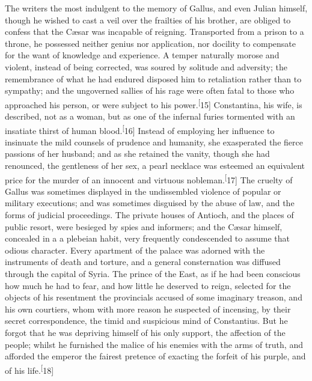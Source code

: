 The writers the most indulgent to the memory of Gallus, and even
Julian himself, though he wished to cast a veil over the
frailties of his brother, are obliged to confess that the Cæsar
was incapable of reigning. Transported from a prison to a throne,
he possessed neither genius nor application, nor docility to
compensate for the want of knowledge and experience. A temper
naturally morose and violent, instead of being corrected, was
soured by solitude and adversity; the remembrance of what he had
endured disposed him to retaliation rather than to sympathy; and
the ungoverned sallies of his rage were often fatal to those who
approached his person, or were subject to his power.\textsuperscript[15]
Constantina, his wife, is described, not as a woman, but as one
of the infernal furies tormented with an insatiate thirst of
human blood.\textsuperscript[16] Instead of employing her influence to insinuate
the mild counsels of prudence and humanity, she exasperated the
fierce passions of her husband; and as she retained the vanity,
though she had renounced, the gentleness of her sex, a pearl
necklace was esteemed an equivalent price for the murder of an
innocent and virtuous nobleman.\textsuperscript[17] The cruelty of Gallus was
sometimes displayed in the undissembled violence of popular or
military executions; and was sometimes disguised by the abuse of
law, and the forms of judicial proceedings. The private houses of
Antioch, and the places of public resort, were besieged by spies
and informers; and the Cæsar himself, concealed in a a plebeian
habit, very frequently condescended to assume that odious
character. Every apartment of the palace was adorned with the
instruments of death and torture, and a general consternation was
diffused through the capital of Syria. The prince of the East, as
if he had been conscious how much he had to fear, and how little
he deserved to reign, selected for the objects of his resentment
the provincials accused of some imaginary treason, and his own
courtiers, whom with more reason he suspected of incensing, by
their secret correspondence, the timid and suspicious mind of
Constantius. But he forgot that he was depriving himself of his
only support, the affection of the people; whilst he furnished
the malice of his enemies with the arms of truth, and afforded
the emperor the fairest pretence of exacting the forfeit of his
purple, and of his life.\textsuperscript[18]


